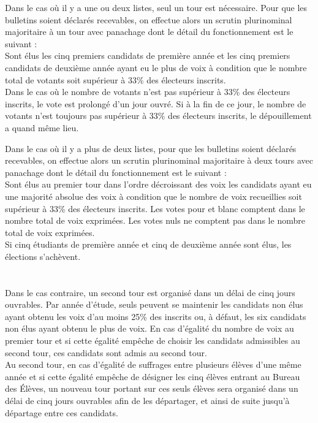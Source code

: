\documentclass{article} %
\begin{document}
				Dans le cas où il y a une ou deux listes, seul un tour est nécessaire. Pour que les bulletins soient déclarés recevables, on effectue alors un
				scrutin plurinominal majoritaire à un tour avec panachage dont le détail du fonctionnement est le suivant :\\
				Sont élus les cinq premiers candidats de première année et les cinq premiers candidats de deuxième année ayant eu le plus de voix
				à condition que le nombre total de votants soit supérieur à 33\% des électeurs inscrits.\\
				Dans le cas où le nombre de votants n’est pas supérieur à 33\% des électeurs inscrits, le vote est prolongé d’un jour ouvré.
				Si à la fin de ce jour, le nombre de votants n’est toujours pas supérieur à 33\% des électeurs inscrits, le dépouillement a quand même lieu.

				Dans le cas où il y a plus de deux listes, pour que les bulletins soient déclarés recevables, on effectue alors un scrutin plurinominal majoritaire
				à deux tours avec panachage dont le détail du fonctionnement est le suivant :\\
				Sont élus au premier tour dans l’ordre décroissant des voix les candidats ayant eu une majorité absolue des voix à condition que le nombre de voix
				recueillies soit supérieur à 33\% des électeurs inscrits. Les votes pour et blanc comptent dans le nombre total de voix exprimées.
				Les votes nuls ne comptent pas dans le nombre total de voix exprimées.\\
				Si cinq étudiants de première année et cinq de deuxième année sont élus, les élections s’achèvent.\\ \\ \\
				Dans le cas contraire, un second tour est organisé dans un délai de cinq jours ouvrables. Par année d’étude, seuls peuvent se maintenir
				les candidats non élus ayant obtenu les voix d’au moins 25\% des inscrits ou, à défaut, les six candidats non élus ayant obtenu le plus de voix.
				En cas d’égalité du nombre de voix au premier tour et si cette égalité empêche de choisir les candidats admissibles au second tour, ces candidats sont admis au second tour.\\
				Au second tour, en cas d'égalité de suffrages entre plusieurs élèves d'une même année et si cette égalité empêche de désigner les cinq élèves entrant
				au Bureau des Élèves, un nouveau tour portant sur ces seuls élèves sera organisé dans un délai de cinq jours ouvrables afin de les départager,
				et ainsi de suite jusqu’à départage entre ces candidats.
\end{document}
